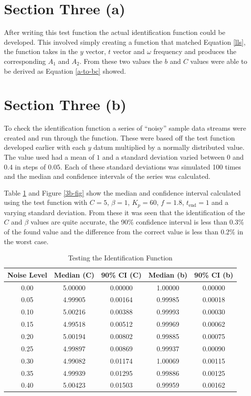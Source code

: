 \section*{Section Three (a)}

After writing this test function the actual identification function could be
developed.  This involved simply creating a function that matched Equation
\eqref{lls}, the function takes in the $y$ vector, $t$ vector and $\omega$
frequency and produces the corresponding $A_1$ and $A_2$.  From these two values
the $b$ and $C$ values were able to be derived as Equation \eqref{a-to-bc}
showed.

\section*{Section Three (b)}

To check the identification function a series of ``noisy'' sample data streams
were created and run through the function.  These were based off the test function
developed earlier with each $y$ datum multiplied by a normally distributed
value.  The value used had a mean of $1$ and a standard deviation varied between
$0$ and $0.4$ in steps of $0.05$.  Each of these standard deviations was
simulated 100 times and the median and confidence intervals of the series was
calculated.

Table \ref{3b} and Figure \ref{3b-fig} show the median and confidence interval
calculated using the test function with $C = 5$, $\beta = 1$, $K_p = 60$, $f =
1.8$, $t_\text{end} = 1$ and a varying standard deviation.  From these it was
seen that the identification of the $C$ and $\beta$ values are quite accurate,
the 90\% confidence interval is less than 0.3\% of the found value and the
difference from the correct value is less than 0.2\% in the worst case.

\begin{table}
  \centering\scriptsize
  \begin{tabular}{c|c|c|c|c}
  Noise Level & Median (C) & 90\% CI (C) & Median (b) & 90\% CI (b) \\
  \hline
  0.00 & 5.00000 & 0.00000 & 1.00000 & 0.00000 \\
  0.05 & 4.99905 & 0.00164 & 0.99985 & 0.00018 \\
  0.10 & 5.00216 & 0.00388 & 0.99993 & 0.00030 \\
  0.15 & 4.99518 & 0.00512 & 0.99969 & 0.00062 \\
  0.20 & 5.00194 & 0.00802 & 0.99885 & 0.00075 \\
  0.25 & 4.99897 & 0.00869 & 0.99937 & 0.00090 \\
  0.30 & 4.99082 & 0.01174 & 1.00069 & 0.00115 \\
  0.35 & 4.99939 & 0.01295 & 0.99886 & 0.00125 \\
  0.40 & 5.00423 & 0.01503 & 0.99959 & 0.00162  
  \end{tabular}
  \caption{Testing the Identification Function\label{3b}}
\end{table}

